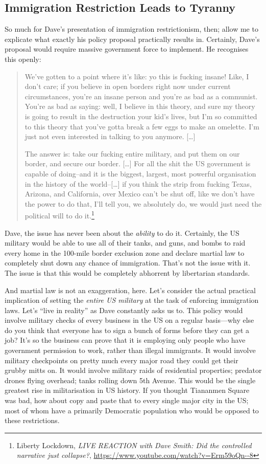 \documentclass[11pt]{article}
\begin{document}
\subsection{Immigration Restriction Leads to Tyranny}
\label{sec:org7b4ab46}
So much for Dave's presentation of immigration restrictionism, then; allow me to explicate what exactly his policy proposal practically results in. Certainly, Dave's proposal would require massive government force to implement. He recognises this openly:
\begin{quote}
We've gotten to a point where it's like: yo this is fucking insane! Like, I don't care; if you believe in open borders right now under current circumstances, you're an insane person and you're as bad as a communist. You're as bad as saying: well, I believe in this theory, and sure my theory is going to result in the destruction your kid's lives, but I'm so committed to this theory that you've gotta break a few eggs to make an omelette. I'm just not even interested in talking to you anymore. [\ldots{}]

The answer is: take our fucking entire military, and put them on our border, and secure our border. [\ldots{}] For all the shit the US government is capable of doing--and it is the biggest, largest, most powerful organisation in the history of the world--[\ldots{}] if you think the strip from fucking Texas, Arizona, and California, over Mexico can't be shut off, like we don't have the power to do that, I'll tell you, we absolutely do, we would just need the political will to do it.\footnote{Liberty Lockdown, \emph{LIVE REACTION with Dave Smith: Did the controlled narrative just collapse?}, \url{https://www.youtube.com/watch?v=Erm59oQn--8}}
\end{quote}

Dave, the issue has never been about the \emph{ability} to do it. Certainly, the US military would be able to use all of their tanks, and guns, and bombs to raid every home in the 100-mile border exclusion zone and declare martial law to completely shut down any chance of immigration. That's not the issue with it. The issue is that this would be completely abhorrent by libertarian standards.

And martial law is not an exaggeration, here. Let's consider the actual practical implication of setting the \emph{entire US military} at the task of enforcing immigration laws. Let's ``live in reality'' as Dave constantly asks us to. This policy would involve military checks of every business in the US on a regular basis---why else do you think that everyone has to sign a bunch of forms before they can get a job? It's so the business can prove that it is employing only people who have government permission to work, rather than illegal immigrants. It would involve military checkpoints on pretty much every major road they could get their grubby mitts on. It would involve military raids of residential properties; predator drones flying overhead; tanks rolling down 5th Avenue. This would be the single greatest rise in militarisation in US history. If you thought Tiananmen Square was bad, how about copy and paste that to every single major city in the US; most of whom have a primarily Democratic population who would be opposed to these restrictions.
\end{document}
